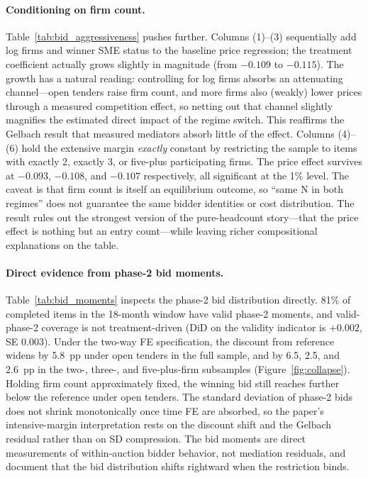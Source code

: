 \paragraph{Conditioning on firm count.}
Table~\ref{tab:bid_aggressiveness} pushes further. Columns (1)--(3) sequentially add log firms and winner SME status to the baseline price regression; the treatment coefficient actually grows slightly in magnitude (from $-0.109$ to $-0.115$). The growth has a natural reading: controlling for log firms absorbs an attenuating channel---open tenders raise firm count, and more firms also (weakly) lower prices through a measured competition effect, so netting out that channel slightly magnifies the estimated direct impact of the regime switch. This reaffirms the Gelbach result that measured mediators absorb little of the effect. Columns (4)--(6) hold the extensive margin \emph{exactly} constant by restricting the sample to items with exactly 2, exactly 3, or five-plus participating firms. The price effect survives at $-0.093$, $-0.108$, and $-0.107$ respectively, all significant at the 1\% level. The caveat is that firm count is itself an equilibrium outcome, so ``same N in both regimes'' does not guarantee the same bidder identities or cost distribution. The result rules out the strongest version of the pure-headcount story---that the price effect is nothing but an entry count---while leaving richer compositional explanations on the table.



\paragraph{Direct evidence from phase-2 bid moments.}
Table~\ref{tab:bid_moments} inspects the phase-2 bid distribution directly. 81\% of completed items in the 18-month window have valid phase-2 moments, and valid-phase-2 coverage is not treatment-driven (DiD on the validity indicator is $+0.002$, SE $0.003$). Under the two-way FE specification, the discount from reference widens by 5.8~pp under open tenders in the full sample, and by 6.5, 2.5, and 2.6~pp in the two-, three-, and five-plus-firm subsamples (Figure~\ref{fig:collapse}). Holding firm count approximately fixed, the winning bid still reaches further below the reference under open tenders. The standard deviation of phase-2 bids does not shrink monotonically once time FE are absorbed, so the paper's intensive-margin interpretation rests on the discount shift and the Gelbach residual rather than on SD compression. The bid moments are direct measurements of within-auction bidder behavior, not mediation residuals, and document that the bid distribution shifts rightward when the restriction binds.

